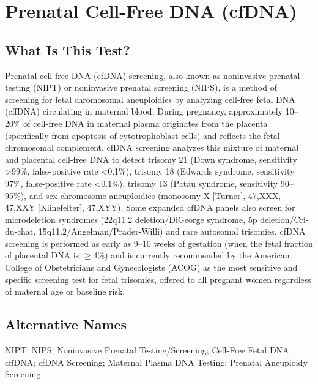 \chapter{Prenatal Cell-Free DNA (cfDNA)}

\section*{What Is This Test?}
Prenatal cell-free DNA (cfDNA) screening, also known as noninvasive prenatal testing (NIPT) or noninvasive prenatal screening (NIPS), is a method of screening for fetal chromosomal aneuploidies by analyzing cell-free fetal DNA (cffDNA) circulating in maternal blood. During pregnancy, approximately 10--20\% of cell-free DNA in maternal plasma originates from the placenta (specifically from apoptosis of cytotrophoblast cells) and reflects the fetal chromosomal complement. cfDNA screening analyzes this mixture of maternal and placental cell-free DNA to detect trisomy 21 (Down syndrome, sensitivity >99\%, false-positive rate <0.1\%), trisomy 18 (Edwards syndrome, sensitivity 97\%, false-positive rate <0.1\%), trisomy 13 (Patau syndrome, sensitivity 90--95\%), and sex chromosome aneuploidies (monosomy X [Turner], 47,XXX, 47,XXY [Klinefelter], 47,XYY). Some expanded cfDNA panels also screen for microdeletion syndromes (22q11.2 deletion/DiGeorge syndrome, 5p deletion/Cri-du-chat, 15q11.2/Angelman/Prader-Willi) and rare autosomal trisomies. cfDNA screening is performed as early as 9--10 weeks of gestation (when the fetal fraction of placental DNA is $\geq$4\%) and is currently recommended by the American College of Obstetricians and Gynecologists (ACOG) as the most sensitive and specific screening test for fetal trisomies, offered to all pregnant women regardless of maternal age or baseline risk.

\section*{Alternative Names}
NIPT; NIPS; Noninvasive Prenatal Testing/Screening; Cell-Free Fetal DNA; cffDNA; cfDNA Screening; Maternal Plasma DNA Testing; Prenatal Aneuploidy Screening

